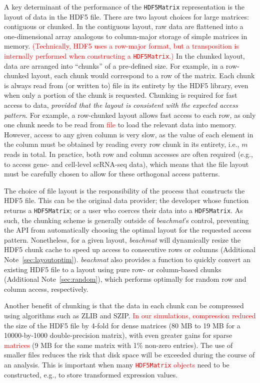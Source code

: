 \documentclass{article}
\newcommand{\beachmat}{\textit{beachmat}}
\newcommand{\code}[1]{\texttt{#1}}
\newcommand{\revised}[1]{\textcolor{red}{#1}}
\begin{document}
A key determinant of the performance of the \code{HDF5Matrix} representation is the layout of data in the HDF5 file.
There are two layout choices for large matrices: contiguous or chunked.
In the contiguous layout, raw data are flattened into a one-dimensional array analogous to column-major storage of simple matrices in memory.
\revised{(Technically, HDF5 uses a row-major format, but a transposition is internally performed when constructing a \code{HDF5Matrix}.)}
In the chunked layout, data are arranged into ``chunks'' of a pre-defined size.
For example, in a row-chunked layout, each chunk would correspond to a row of the matrix.
Each chunk is always read from (or written to) file in its entirety by the HDF5 library, even when only a portion of the chunk is requested.
Chunking is required for fast access to data, \textit{provided that the layout is consistent with the expected access pattern}.
For example, a row-chunked layout allows fast access to each row, as only one chunk needs to be read from \revised{file} to load the relevant data into memory.
However, access to any given column is very slow, as the value of each element in the column must be obtained by reading every row chunk in its entirety, i.e., $m$ reads in total.
In practice, both row and column accesses are often required (e.g., to access gene- and cell-level scRNA-seq data), which means that the file layout must be carefully chosen to allow for these orthogonal access patterns.

The choice of file layout is the responsibility of the process that constructs the HDF5 file.
This can be the original data provider; the developer whose function returns a \code{HDF5Matrix}; or a user who coerces their data into a \code{HDF5Matrix}.
As such, the chunking scheme is generally outside of \beachmat{}'s control, preventing the API from automatically choosing the optimal layout for the requested access pattern.
Nonetheless, for a given layout, \beachmat{} will dynamically resize the HDF5 chunk cache to speed up access to consecutive rows or columns (Additional Note~\ref{sec:layoutoptim}).
\beachmat{} also provides a function to quickly convert an existing HDF5 file to a layout using pure row- or column-based chunks (Additional Note~\ref{sec:random}), which performs optimally for random row and column access, respectively.

Another benefit of chunking is that the data in each chunk can be compressed using algorithms such as ZLIB and SZIP.
\revised{In our simulations, compression reduced} the size of the HDF5 file by 4-fold for dense matrices (80 MB to 19 MB for a 10000-by-1000 double-precision matrix), with even greater gains for sparse \revised{matrices} (9 MB for the same matrix with 1\% non-zero entries).
The use of smaller files reduces the risk that disk space will be exceeded during the course of an analysis.
This is important when many \revised{\code{HDF5Matrix} objects} need to be constructed, e.g., to store transformed expression values.
\end{document}
